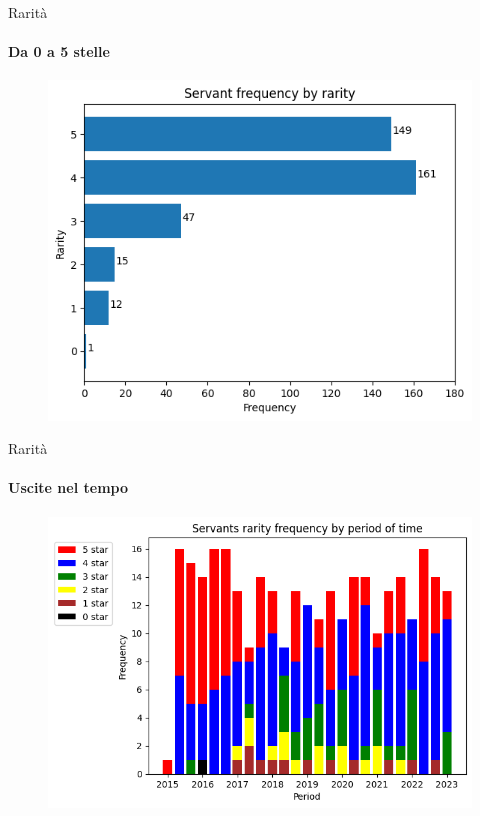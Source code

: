 \documentclass{beamer}
\begin{document}
\begin{darkframes}
  \begin{frame}{Rarità}
    \framesubtitle{Da 0 a 5 stelle}
    \begin{figure}
      \centering
      \includegraphics[scale=0.60]{./images/frequency_by_rarity.png}
    \end{figure}
  \end{frame}

  \begin{frame}{Rarità}
    \framesubtitle{Uscite nel tempo}
    \begin{figure}
      \centering
      \includegraphics[scale=0.6]{./images/rarity_per_year_bar.png}
    \end{figure}
  \end{frame}


\end{darkframes}
\end{document}
